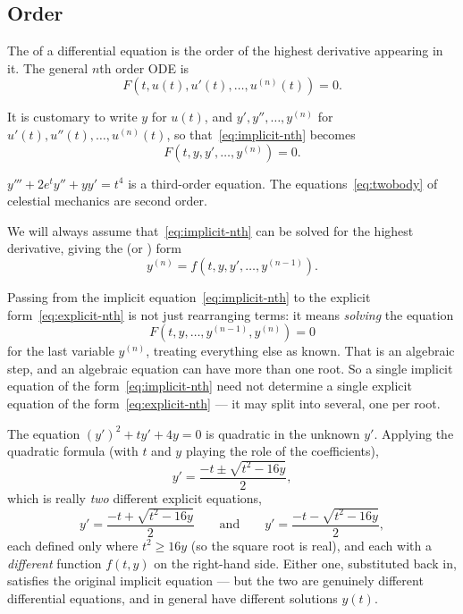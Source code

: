 \subsection{Order}

\begin{definition}[Order]
	The  of a differential equation is the order of the highest derivative
	appearing in it. The general \(n\)th order ODE is
	\begin{equation}\label{eq:implicit-nth}
		F\left( t, u(t), u'(t), \dots, u^{(n)}(t) \right) = 0.
	\end{equation}
\end{definition}

\begin{notation}
	It is customary to write \(y\) for \(u(t)\), and \(y', y'', \dots, y^{(n)}\) for
	\(u'(t), u''(t), \dots, u^{(n)}(t)\), so that~\eqref{eq:implicit-nth} becomes
	\[
		F\left( t, y, y', \dots, y^{(n)} \right) = 0.
	\]
\end{notation}

\begin{eg}
	\(y''' + 2e^{t} y'' + y y' = t^4\) is a third-order equation. The
	equations~\eqref{eq:twobody} of celestial mechanics are second order.
\end{eg}

We will always assume that~\eqref{eq:implicit-nth} can be solved for the highest
derivative, giving the  (or ) form
\begin{equation}\label{eq:explicit-nth}
	y^{(n)} = f\left( t, y, y', \dots, y^{(n-1)} \right).
\end{equation}

\begin{remark}
	Passing from the implicit equation~\eqref{eq:implicit-nth} to the explicit
	form~\eqref{eq:explicit-nth} is not just rearranging terms: it means \emph{solving}
	the equation
	\[
		F\left( t, y, \dots, y^{(n-1)}, y^{(n)} \right) = 0
	\]
	for the last variable \(y^{(n)}\), treating everything else as known. That is an
	algebraic step, and an algebraic equation can have more than one root. So a single
	implicit
	equation of the form~\eqref{eq:implicit-nth} need not determine a single explicit
	equation of the form~\eqref{eq:explicit-nth} --- it may split into several, one per
	root.
\end{remark}

\begin{eg}
	The equation \((y')^2 + t y' + 4y = 0\) is quadratic in the unknown \(y'\). Applying
	the quadratic formula (with \(t\) and \(y\) playing the role of the coefficients),
	\[
		y' = \frac{-t \pm \sqrt{t^2 - 16y}}{2},
	\]
	which is really \emph{two} different explicit equations,
	\[
		y' = \frac{-t + \sqrt{t^2 - 16y}}{2}
		\qquad\text{and}\qquad
		y' = \frac{-t - \sqrt{t^2 - 16y}}{2},
	\]
	each defined only where \(t^2 \geq 16y\) (so the square root is real), and each with
	a \emph{different} function \(f(t,y)\) on the right-hand side. Either one, substituted
	back in, satisfies the original implicit equation --- but the two are genuinely
	different differential equations, and in general have different solutions \(y(t)\).
\end{eg}

